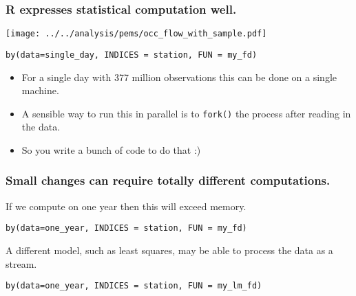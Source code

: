 \documentclass{beamer}
\begin{document}
\begin{frame}[fragile]

    \frametitle{R expresses statistical computation well.}


    \centerline{\texttt{[image: ../../analysis/pems/occ\_flow\_with\_sample.pdf]}}

\begin{verbatim}
by(data=single_day, INDICES = station, FUN = my_fd)
\end{verbatim}

    \pause

    \begin{itemize}
        \item For a single day with 377 million observations this can be
            done on a single machine.
        \item A sensible way to run this in parallel is to \texttt{fork()}
            the process after reading in the data.
        \item So you write a bunch of code to do that :)
    \end{itemize}

\end{frame}
\begin{frame}[fragile]

    \frametitle{Small changes can require totally different
    computations.}


    If we compute on one year then this will exceed memory.

\begin{verbatim}
by(data=one_year, INDICES = station, FUN = my_fd)
\end{verbatim}

\pause 

    A different model, such as least squares, may be able to process the
    data as a stream.

\begin{verbatim}
by(data=one_year, INDICES = station, FUN = my_lm_fd)
\end{verbatim}

\end{frame}
\end{document}
